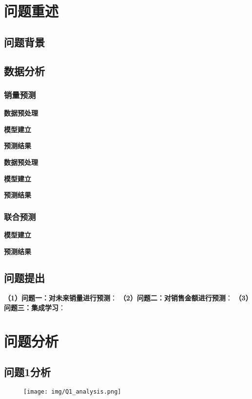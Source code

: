 \documentclass[a4paper]{article}
\begin{document}
	\tableofcontents  
	\newpage 
	
	\pagestyle{mainmatter}
	\setcounter{page}{1}
	\section{问题重述}
	\subsection{问题背景}
	

	\subsection{数据分析}

	
	\subsubsection{销量预测}

	
	\textbf{数据预处理}
	

	\textbf{模型建立}
	
	
	\textbf{预测结果}
	

	\textbf{数据预处理}

	
	\textbf{模型建立}
	
	
	\textbf{预测结果}
	
	
	\subsubsection{联合预测}
	
	
	\textbf{模型建立}
	
	
	\textbf{预测结果}
	
	
	\subsection{问题提出}
	\textbf{（1）问题一：对未来销量进行预测}：
	\textbf{（2）问题二：对销售金额进行预测}：
	\textbf{（3）问题三：集成学习}：
	\section{问题分析}
	\subsection{问题1分析}
		\begin{figure}[H]
			\centering
			\texttt{[image: img/Q1\_analysis.png]}
		\end{figure}
\end{document}
